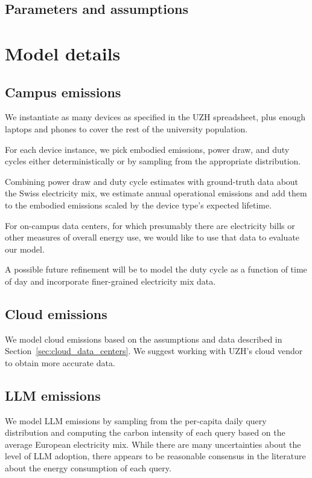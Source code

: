 \documentclass[11pt]{article}
\begin{document}
\subsection{Parameters and assumptions}

\section{Model details}
\label{sec:model:details}

\subsection{Campus emissions}

We instantiate as many devices as specified in the UZH spreadsheet, plus enough laptops and phones
to cover the rest of the university population.

For each device instance, we pick embodied emissions, power draw, and duty cycles either
deterministically or by sampling from the appropriate distribution.

Combining power draw and duty cycle estimates with ground-truth data about the Swiss electricity mix,
we estimate annual operational emissions and add them to the embodied emissions scaled by the device
type's expected lifetime.

For on-campus data centers, for which presumably there are electricity bills or other measures of
overall energy use, we would like to use that data to evaluate our model.

A possible future refinement will be to model the duty cycle as a function of time of day
and incorporate finer-grained electricity mix data.

\subsection{Cloud emissions}

We model cloud emissions based on the assumptions and data described in
Section~\ref{sec:cloud_data_centers}. We suggest working with UZH's cloud vendor to obtain
more accurate data.

\subsection{LLM emissions}

We model LLM emissions by sampling from the per-capita daily query distribution and computing
the carbon intensity of each query based on the average European electricity mix. While there
are many uncertainties about the level of LLM adoption, there appears to be reasonable consensus
in the literature about the energy consumption of each query.
\end{document}
